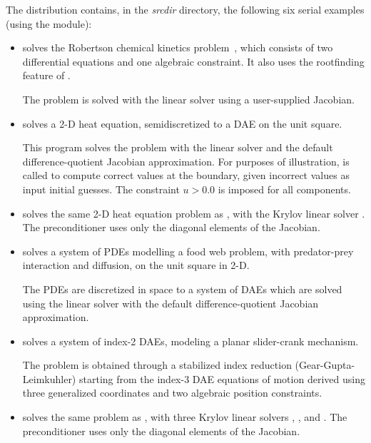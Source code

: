 \vspace{0.2in}\noindent
The {\ida} distribution contains, in the {\em srcdir}
directory, the following six serial examples (using the {\nvecs} module):
\begin{itemize}

\item {}
  solves the Robertson chemical kinetics problem~\cite{Rob:66}, which consists
  of two differential equations and one algebraic constraint.  It also uses
  the rootfinding feature of {\ida}.

  The problem is solved with the {\idadense} linear solver using
  a user-supplied Jacobian.

\item {}
  solves a 2-D heat equation, semidiscretized to a DAE on the unit square.

  This program solves the problem with the {\idaband} linear solver and
  the default difference-quotient Jacobian approximation. For purposes of
  illustration,  is called to compute correct values at the
  boundary, given incorrect values as input initial guesses. The constraint
  $u > 0.0$ is imposed for all components.

\item {}
  solves the same 2-D heat equation problem as , with the Krylov
  linear solver {\idaspgmr}. The preconditioner uses only the diagonal elements
  of the Jacobian.

\item {}
  solves a system of PDEs modelling a food web problem, with predator-prey
  interaction and diffusion, on the unit square in 2-D.

  The PDEs are discretized in space to a system of DAEs which are solved
  using the {\idaband} linear solver with the default difference-quotient 
  Jacobian approximation.

\item {}
  solves a system of index-2 DAEs, modeling a planar slider-crank mechanism.

  The problem is obtained through a stabilized index reduction (Gear-Gupta-Leimkuhler)
  starting from the index-3 DAE equations of motion derived using three generalized
  coordinates and two algebraic position constraints.

\item {}
  solves the same problem as , with three Krylov linear solvers
  {\idaspgmr}, {\idaspbcg}, and {\idasptfqmr}.  The preconditioner uses only
  the diagonal elements of the Jacobian.

\end{itemize}

